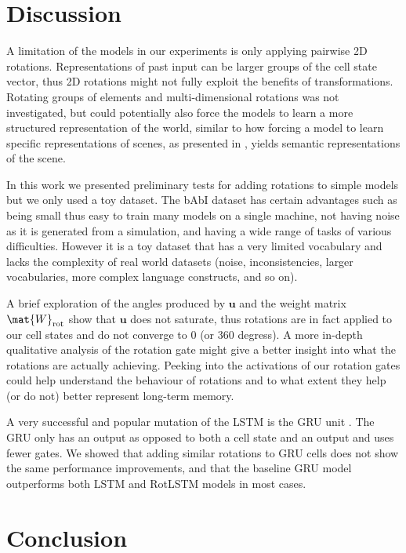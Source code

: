\documentclass{article}
\begin{document}
\section{Discussion}

A limitation of the models in our experiments is only applying pairwise 2D rotations. Representations of past input can be larger groups of the cell state vector, thus 2D rotations might not fully exploit the benefits of transformations. Rotating groups of elements and multi-dimensional rotations was not investigated, but could potentially also force the models to learn a more structured representation of the world, similar to how forcing a model to learn specific representations of scenes, as presented in \cite{higgins2017scan}, yields semantic representations of the scene.

In this work we presented preliminary tests for adding rotations to simple models but we only used a toy dataset. The bAbI dataset has certain advantages such as being small thus easy to train many models on a single machine, not having noise as it is generated from a simulation, and having a wide range of tasks of various difficulties. However it is a toy dataset that has a very limited vocabulary and lacks the complexity of real world datasets (noise, inconsistencies, larger vocabularies, more complex language constructs, and so on).

A brief exploration of the angles produced by $\mathbf{u}$ and the weight matrix $\mat{W}_\text{rot}$ show that $\mathbf{u}$ does not saturate, thus rotations are in fact applied to our cell states and do not converge to 0 (or 360 degress). A more in-depth qualitative analysis of the rotation gate might give a better insight into what the rotations are actually achieving. Peeking into the activations of our rotation gates could help understand the behaviour of rotations and to what extent they help (or do not) better represent long-term memory.

A very successful and popular mutation of the \ac{LSTM} is the \ac{GRU} unit \citep{cho2014learning}. The GRU only has an output as opposed to both a cell state and an output and uses fewer gates. We showed that adding similar rotations to GRU cells does not show the same performance improvements, and that the baseline GRU model outperforms both LSTM and RotLSTM models in most cases.

\section{Conclusion}
\end{document}
